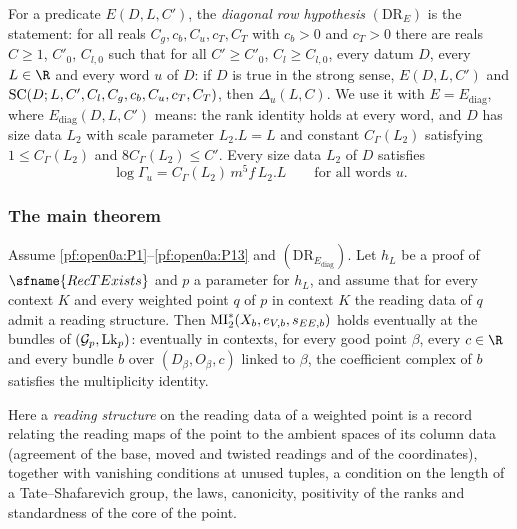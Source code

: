 \begin{definition}\label{pf:open0a:def:rowdiag}
For a predicate $E(D,L,C')$, the \emph{diagonal row hypothesis} $(\mathrm{DR}_E)$ is the statement: for all reals
$C_g,c_b,C_u,c_T,C_T$ with $c_b>0$ and $c_T>0$ there are reals $C\ge1$, $C'_0$, $C_{l,0}$ such that for all
$C'\ge C'_0$, $C_l\ge C_{l,0}$, every datum $D$, every $L\in\R$ and every word $u$ of $D$: if $D$ is true in the strong
sense, $E(D,L,C')$ and $\mathrm{SC}(D;L,C',C_l,C_g,c_b,C_u,c_T,C_T)$, then $\Delta_u(L,C)$. We use it with
$E=E_{\mathrm{diag}}$, where $E_{\mathrm{diag}}(D,L,C')$ means: the rank identity holds at every word, and $D$ has size
data $L_2$ with scale parameter $L_2.L=L$ and constant $C_\Gamma(L_2)$ satisfying $1\le C_\Gamma(L_2)$ and
$8C_\Gamma(L_2)\le C'$. Every size data $L_2$ of $D$ satisfies
\begin{equation}\label{pf:open0a:eq:Gam}
\log\Gamma_u=C_\Gamma(L_2)\,m^5f\,L_2.L\qquad\text{for all words }u.
\end{equation}
\end{definition}

\subsubsection{The main theorem}

\begin{theorem}\label{pf:open0a:main}
Assume \ref{pf:open0a:P1}--\ref{pf:open0a:P13} and $(\mathrm{DR}_{E_{\mathrm{diag}}})$. Let $h_L$ be a proof of
$\sfname{RecTExists}$ and $p$ a parameter for $h_L$, and assume that for every context $K$ and every weighted point $q$
of $p$ in context $K$ the reading data of $q$ admit a reading structure. Then $\mathrm{MI}^{*}_{2}(X_b,e_{V,b},s_{EE,b})$ holds
eventually at the bundles of $(\mathcal G_p,\mathrm{Lk}_p)$: eventually in contexts, for every good point $\beta$,
every $c\in\R$ and every bundle $b$ over $(D_\beta,O_\beta,c)$ linked to $\beta$, the coefficient complex of $b$
satisfies the multiplicity identity.
\
\end{theorem}

Here a \emph{reading structure} on the reading data of a weighted point is a record relating the reading maps of the
point to the ambient spaces of its column data (agreement of the base, moved and twisted readings and of the
coordinates), together with vanishing conditions at unused tuples, a condition on the length of a Tate--Shafarevich
group, the laws, canonicity, positivity of the ranks and standardness of the core of the point.


